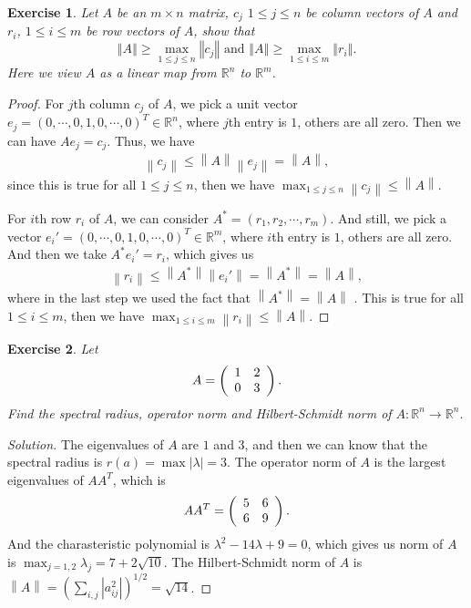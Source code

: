 \documentclass[11pt]{book}
\newtheorem{exercise}{Exercise}[section]
\theoremstyle{definition}
\numberwithin{equation}{chapter}
\begin{document}
\begin{exercise}
Let $A$ be an $m\times n$ matrix, $c_{j}$ $1\leq j\leq n$ be column
vectors of $A$ and $r_{i}$, $1\leq i\leq m$ be row vectors of $A$, show that%
$$
\left\Vert A\right\Vert \geq\max_{1\leq j\leq n}\left\Vert c_{j}\right\Vert
\text{ and }\left\Vert A\right\Vert \geq\max_{1\leq i\leq m}\left\Vert
r_{i}\right\Vert .
$$
Here we view $A$ as a linear map from $\mathbb{R}^{n}$ to $\mathbb{R}^{m}$.
\end{exercise}
\begin{proof}
For $j$th column $c_j$ of $A$, we pick a unit vector $e_j = (0,\cdots, 0,1,0,\cdots,0)^T \in \mathbb{R}^n$, where $j$th entry is $1$, others are all zero. Then we can have $Ae_j = c_j$. Thus, we have 
\begin{align*}
    \left\|c_j \right\| \leq \left\|A \right\| \left\|e_j  \right\| = \left\|A \right\|,
\end{align*}
since this is true for all $1\leq j \leq n$, then we have $\max_{1\leq j \leq n}\left\|c_j \right\| \leq \left\|A \right\|$. 

For $i$th row $r_i$ of $A$, we can consider $A^* = (r_1, r_2,\cdots, r_m)$. And still, we pick a vector $e_i' = (0,\cdots, 0,1,0,\cdots,0)^T \in \mathbb{R}^m$, where $i$th entry is $1$, others are all zero. And then we take $A^* e_i' = r_i$, which gives us 
\begin{align*}
    \left\|r_i \right\| \leq \left\|A^* \right\| \left\|e_i'  \right\| = \left\|A^* \right\| = \left\|A \right\|,
\end{align*}
where in the last step we used the fact that $\left\|A^* \right\| = \left\|A \right\|$ . This is true for all $1\leq i \leq m$, then we have $\max_{1\leq i \leq m}\left\|r_i \right\| \leq \left\|A \right\|$.
\end{proof}

\medskip

\begin{exercise}
Let
$$
A=\left(
\begin{array}
[c]{cc}%
1 & 2\\
0 & 3
\end{array}
\right)  .
$$
Find the spectral radius, operator norm and Hilbert-Schmidt norm of
$A:\mathbb{R}^{n}\rightarrow\mathbb{R}^{n}$.
\end{exercise}
\begin{proof}[Solution]
The eigenvalues of $A$ are $1$ and $3$, and then we can know that the spectral radius is $r(a) = \max \left|\lambda\right| = 3$. The operator norm of $A$ is  the largest eigenvalues of $AA^T$, which is 
$$
AA^T=\left(
\begin{array}
[c]{cc}%
5 & 6\\
6 & 9
\end{array}
\right).
$$
And the charasteristic polynomial is $\lambda^2 - 14\lambda + 9 = 0$, which gives us norm of $A$ is $\max_{j=1,2} \lambda_j = 7+2\sqrt{10}$. The Hilbert-Schmidt norm of $A$ is $\left\| A\right\| = \left(\sum_{i,j}|a_{ij}^2| \right)^{1/2} = \sqrt{14}$.
\end{proof}
\end{document}
